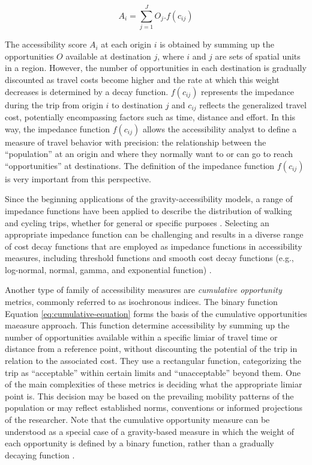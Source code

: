\documentclass[preprint, 3p,
authoryear]{elsarticle} %
\begin{document}
\begin{equation}
A_{i} = \sum_{j=1}^J O_j .f(c_{ij})
\label{eq:accessibility-equation}
\end{equation}

The accessibility score \(A_{i}\) at each origin \(i\) is obtained by
summing up the opportunities \(O\) available at destination \(j\), where
\(i\) and \(j\) are sets of spatial units in a region. However, the
number of opportunities in each destination is gradually discounted as
travel costs become higher and the rate at which this weight decreases
is determined by a decay function. \(f(c_{ij})\) represents the
impedance during the trip from origin \(i\) to destination \(j\) and
\(c_{ij}\) reflects the generalized travel cost, potentially
encompassing factors such as time, distance and effort. In this way, the
impedance function \(f(c_{ij})\) allows the accessibility analyst to
define a measure of travel behavior with precision: the relationship
between the ``population'' at an origin and where they normally want to
or can go to reach ``opportunities'' at destinations. The definition of
the impedance function \(f(c_{ij})\) is very important from this
perspective.

Since the beginning applications of the gravity-accessibility models, a
range of impedance functions have been applied to describe the
distribution of walking and cycling trips, whether for general or
specific purposes
\citep{iacono2008access, iacono2010, larsen2010, yang2012walking, millward2013active, vale2017influence, li2020approach}.
Selecting an appropriate impedance function can be challenging and
results in a diverse range of cost decay functions that are employed as
impedance functions in accessibility measures, including threshold
functions and smooth cost decay functions (e.g., log-normal, normal,
gamma, and exponential function)
\citep{de2009exponential, reggiani2011accessibility, osth2016new}.

Another type of family of accessibility measures are \emph{cumulative
opportunity} metrics, commonly referred to as isochronous indices. The
binary function Equation \ref{eq:cumulative-equation} forms the basis of
the cumulative opportunities maeasure approach. This function determine
accessibility by summing up the number of opportunities available within
a specific limiar of travel time or distance from a reference point,
without discounting the potential of the trip in relation to the
associated cost. They use a rectangular function, categorizing the trip
as ``acceptable'' within certain limits and ``unacceptable'' beyond
them. One of the main complexities of these metrics is deciding what the
appropriate limiar point is. This decision may be based on the
prevailing mobility patterns of the population or may reflect
established norms, conventions or informed projections of the
researcher. Note that the cumulative opportunity measure can be
understood as a special case of a gravity-based measure in which the
weight of each opportunity is defined by a binary function, rather than
a gradually decaying function \citep{pereira2023}.
\end{document}
